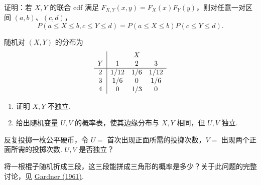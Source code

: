 \begin{exercise}\label{exercise:4.9}
证明：若 $X,Y$ 的联合 cdf 满足 $F_{X,Y}(x,y)=F_X(x)F_Y(y)$，则对任意一对区间 $(a,b)$、$(c,d)$，
$$P(a\le X\le b,c\le Y\le d)=P(a\le X\le b)P(c\le Y\le d).$$
\end{exercise}
\begin{exercise}\label{exercise:4.10}
随机对 $(X,Y)$ 的分布为
$$\begin{array}{c|ccc}
 &\multicolumn{3}{c}{X}\\
Y&1&2&3\\\hline
2&1/12&1/6&1/12\\
3&1/6&0&1/6\\
4&0&1/3&0
\end{array}$$
\begin{enumerate}
\item[(a)] 证明 $X,Y$ 不独立.
\item[(b)] 给出随机变量 $U,V$ 的概率表，使其边缘分布与 $X,Y$ 相同，但 $U,V$ 独立.
\end{enumerate}
\end{exercise}
\begin{exercise}\label{exercise:4.11}
反复投掷一枚公平硬币，令 $U=$ 首次出现正面所需的投掷次数，$V=$ 出现两个正面所需的投掷次数. $U,V$ 是否独立？
\end{exercise}
\begin{exercise}\label{exercise:4.12}
将一根棍子随机折成三段，这三段能拼成三角形的概率是多少？关于此问题的完整讨论，见 \hyperref[bib:source132]{Gardner (1961)}.
\end{exercise}


